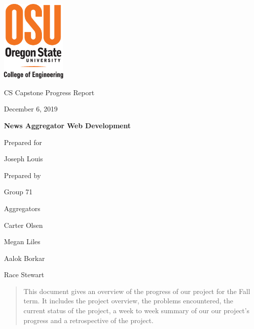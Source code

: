 \documentclass[onecolumn, draftclsnofoot,10pt, compsoc]{IEEEtran}
\def \CapstoneTeamName{Aggregators}
\def \CapstoneTeamNumber{71}
\def \GroupMemberOne{Carter Olsen}
\def \GroupMemberTwo{Megan Liles}
\def \GroupMemberThree{Aalok Borkar}
\def \GroupMemberFour{Race Stewart}
\def \CapstoneProjectName{News Aggregator Web Development}
\def \CapstoneSponsorPerson{Joseph Louis}
\def \DocType{		%
				Progress Report
				}
\begin{document}
\begin{titlepage}
    \begin{singlespace}
    	\includegraphics[height=4cm]{coe_v_spot1}
        \hfill 
        \par\vspace{.2in}
        \centering
        \scshape{
            \huge CS Capstone \DocType \par
            {\large December 6, 2019}\par
            \vspace{.5in}
            \textbf{\Huge\CapstoneProjectName}\par
            \vfill
            {\large Prepared for}\par
            \vspace{5pt}
            {\Large\CapstoneSponsorPerson\par}
            {\large Prepared by }\par
            Group \CapstoneTeamNumber\par
            \CapstoneTeamName\par 
            \vspace{5pt}
            {\Large
                \GroupMemberOne\par
                \GroupMemberTwo\par
                \GroupMemberThree\par
                \GroupMemberFour\par
            }
            \vspace{20pt}
        }
        \begin{abstract}
        This document gives an overview of the progress of our project for the Fall term. It includes the project overview, the problems encountered, the current status of the project, a week to week summary of our our project's progress and a retrospective of the project.
        \end{abstract}     
    \end{singlespace}
\end{titlepage}
\newpage
{}
\tableofcontents
\clearpage
\end{document}
